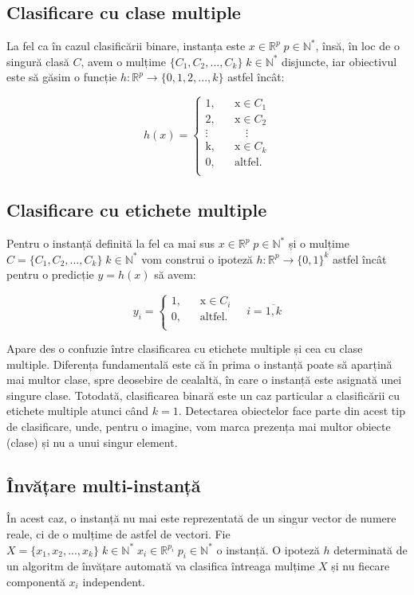 \subsection{Clasificare cu clase multiple}
La fel ca în cazul clasificării binare, instanța este $x\in\mathbb{R}^p \; p\in\mathbb{N^*}$, însă, în loc de o singură clasă $C$, avem o mulțime $\{C_1,C_2,...,C_k\} \; k\in\mathbb{N^*}$ disjuncte, iar obiectivul este să găsim o funcție $h:\mathbb{R}^p\rightarrow\{0,1,2,...,k\}$ astfel încât:

\[
h(x)=
	\begin{cases}
		\text{1,} &\quad\text{x}\in\text{$C_1$} \\
		\text{2,} &\quad\text{x}\in\text{$C_2$} \\
		\vdots &\quad\quad\vdots \\
		\text{k,} &\quad\text{x}\in\text{$C_k$} \\
		\text{0,} &\quad\text{altfel.} \\
	\end{cases}
\]

\subsection{Clasificare cu etichete multiple}
Pentru o instanță definită la fel ca mai sus $x\in\mathbb{R}^p \; p\in\mathbb{N^*}$ și o mulțime $C=\{C_1,C_2,...,C_k\} \; k\in\mathbb{N^*}$ vom construi o ipoteză $h:\mathbb{R}^p\rightarrow\{0, 1\}^k$ astfel încât pentru o predicție $y=h(x)$ să avem:

\[
y_i=
	\begin{cases}
		\text{1,} &\quad\text{x}\in\text{$C_i$} \\
		\text{0,} &\quad\text{altfel.} \\
	\end{cases}
\quad i=\overline{1,k}
\]

Apare des o confuzie între clasificarea cu etichete multiple și cea cu clase multiple. Diferența fundamentală este că în prima o instanță poate să aparțină mai multor clase, spre deosebire de cealaltă, în care o instanță este asignată unei singure clase. Totodată, clasificarea binară este un caz particular a clasificării cu etichete multiple atunci când $k=1$. Detectarea obiectelor face parte din acest tip de clasificare, unde, pentru o imagine, vom marca prezența mai multor obiecte (clase) și nu a unui singur element.

\subsection{Învățare multi-instanță}
În acest caz, o instanță nu mai este reprezentată de un singur vector de numere reale, ci de o mulțime de astfel de vectori. Fie $X=\{x_1, x_2,...,x_k\} \; k\in\mathbb{N^*} \; x_i\in\mathbb{R}^{p_i} \; p_i\in\mathbb{N^*}$ o instanță. O ipoteză $h$ determinată de un algoritm de învățare automată va clasifica întreaga mulțime $X$ și nu fiecare componentă $x_i$ independent.   \cite{multiInstance}\\

